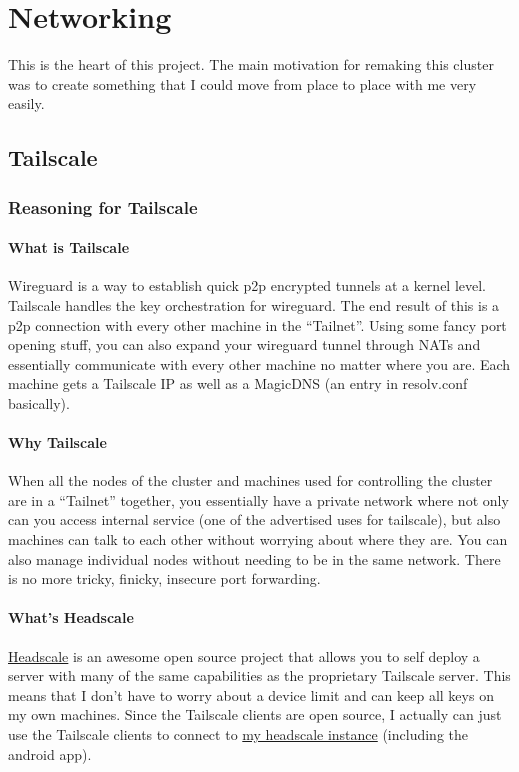 \documentclass[12pt]{article}
\begin{document}
\section{Networking}
This is the heart of this project. The main motivation for remaking this cluster was to create something that I could move from place to place with me very easily.
\subsection{Tailscale}
\subsubsection{Reasoning for Tailscale}
\paragraph{What is Tailscale}Wireguard is a way to establish quick p2p encrypted tunnels at a kernel level. Tailscale handles the key orchestration for wireguard. The end result of this is a p2p connection with every other machine in the ``Tailnet''. Using some fancy port opening stuff, you can also expand your wireguard tunnel through NATs and essentially communicate with every other machine no matter where you are. Each machine gets a Tailscale IP as well as a MagicDNS (an entry in resolv.conf basically).

\paragraph{Why Tailscale}
When all the nodes of the cluster and machines used for controlling the cluster are in a ``Tailnet'' together, you essentially have a private network where not only can you access internal service (one of the advertised uses for tailscale), but also machines can talk to each other without worrying about where they are. You can also manage individual nodes without needing to be in the same network. There is no more tricky, finicky, insecure port forwarding.

\paragraph{What's Headscale}
\label{sec:Headscale}
\href{https://github.com/juanfont/headscale}{Headscale} is an awesome open source project that allows you to self deploy a server with many of the same capabilities as the proprietary Tailscale server. This means that I don't have to worry about a device limit and can keep all keys on my own machines. Since the Tailscale clients are open source, I actually can just use the Tailscale clients to connect to \href{https://tunnel.sachiniyer.com}{my headscale instance} (including the android app).
\end{document}
